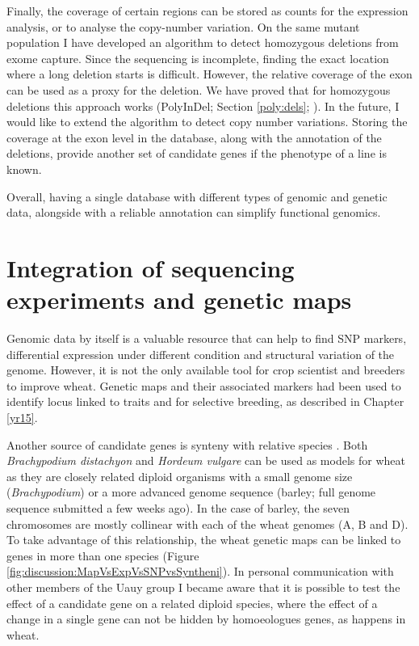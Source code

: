 Finally, the coverage of certain regions can be stored as counts for the expression analysis, or to analyse the copy-number variation. 
On the same mutant population I have developed an algorithm to detect homozygous deletions from exome capture. 
Since the sequencing is incomplete, finding the exact location where a long deletion starts is difficult. 
However, the relative coverage of the exon can be used as a proxy for the deletion. 
We have proved that for homozygous deletions this approach works (PolyInDel; Section \ref{poly:dels}; \citealt{Krasileva2016}). 
In the future, I would like to extend the algorithm to detect copy number variations. 
Storing the coverage at the exon level in the database, along with the annotation of the deletions, provide another set of candidate genes if the phenotype of a line is known. 

Overall, having a single database with different types of genomic and genetic data, alongside with a reliable annotation can simplify functional genomics. 

\section{Integration of sequencing experiments and genetic maps}
Genomic data by itself is a valuable resource that can help to find SNP markers, differential expression under different condition and structural variation of the genome. 
However, it is not the only available tool for crop scientist and breeders to improve wheat. 
Genetic maps and their associated markers had been used to identify locus linked to traits and for selective breeding, as described in Chapter \ref{yr15}. 

Another source of candidate genes is synteny with relative species \citep{Moore1995}.  
Both \textit{Brachypodium distachyon} and \textit{Hordeum vulgare} can be used as models for wheat as they are closely related diploid organisms with a small genome size (\textit{Brachypodium}) or a more advanced genome sequence (barley; full genome sequence submitted a few weeks ago). 
In the case of barley, the seven chromosomes are mostly collinear \citep{Rustenholz2010} with each of the wheat genomes (A, B and D). 
To take advantage of this relationship, the wheat genetic maps can be linked to genes in more than one species (Figure \ref{fig:discussion:MapVsExpVsSNPvsSyntheni}).
In personal communication with other members of the Uauy group I became aware that it is possible to test the effect of a candidate gene on a related diploid species, where the effect of a change in a single gene can not be hidden by homoeologues genes, as happens in wheat. 

